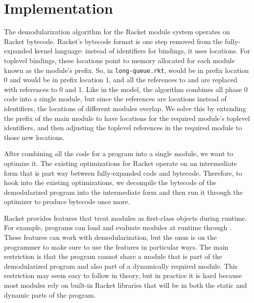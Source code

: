 \chapter{Implementation}

The demodularization algorithm for the Racket module system operates on Racket bytecode. 
Racket's bytecode format is one step removed from the fully-expanded kernel language: instead of identifiers for bindings, it uses locations.
For toplevel bindings, these locations point to memory allocated for each module known as the module's prefix.
So, in \texttt{long-queue.rkt},  would be in prefix location 0 and  would be in prefix location 1, and all the references to  and  are replaced with references to 0 and 1.
Like in the model, the algorithm combines all phase 0 code into a single module, but since the references are locations instead of identifiers, the locations of different modules overlap.
We solve this by extending the prefix of the main module to have locations for the required module's toplevel identifiers, and then adjusting the toplevel references in the required module to those new locations. 

After combining all the code for a program into a single module, we want to optimize it.
The existing optimizations for Racket operate on an intermediate form that is part way between fully-expanded code and bytecode. 
Therefore, to hook into the existing optimizations, we decompile the bytecode of the demodularized program into the intermediate form and then run it through the optimizer to produce bytecode once more.

Racket provides features that treat modules as first-class objects during runtime. 
For example, programs can load and evaluate modules at runtime through . 
These features can work with demodularization, but the onus is on the programmer to make sure to use the features in particular ways.
The main restriction is that the program cannot share a module that is part of the demodularized program and also part of a dynamically required module. 
This restriction may seem easy to follow in theory, but in practice it is hard because most modules rely on built-in Racket libraries that will be in both the static and dynamic parts of the program.

